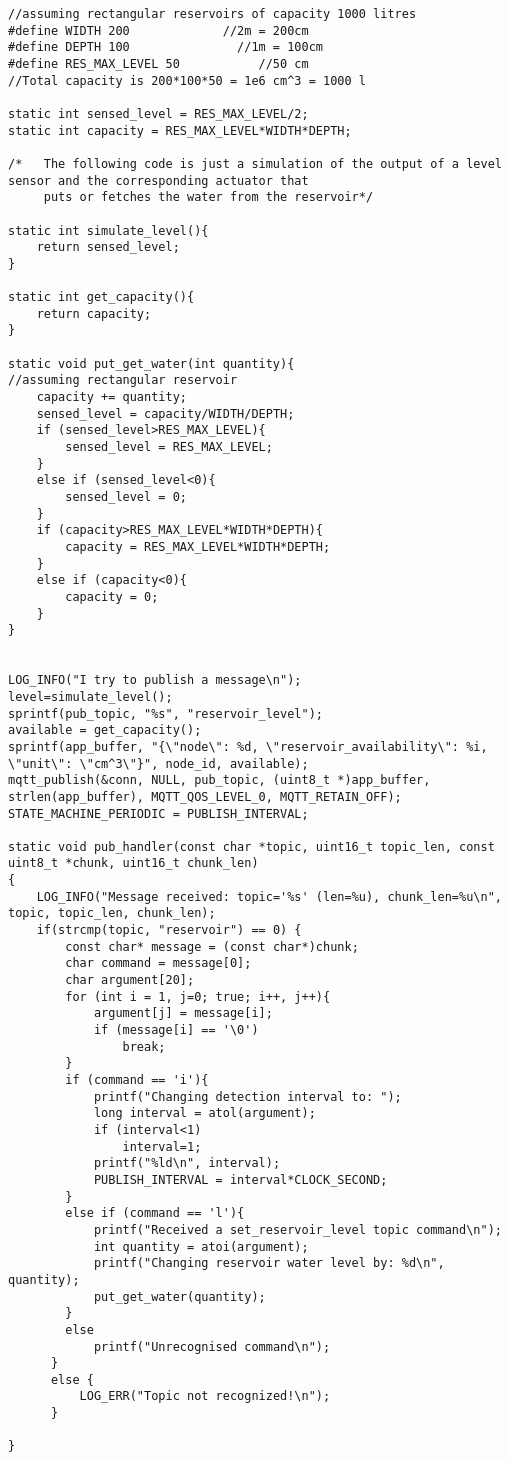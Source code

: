 \begin{lstlisting}
//assuming rectangular reservoirs of capacity 1000 litres
#define WIDTH 200             //2m = 200cm
#define DEPTH 100               //1m = 100cm
#define RES_MAX_LEVEL 50           //50 cm
//Total capacity is 200*100*50 = 1e6 cm^3 = 1000 l

static int sensed_level = RES_MAX_LEVEL/2;
static int capacity = RES_MAX_LEVEL*WIDTH*DEPTH;

/*   The following code is just a simulation of the output of a level sensor and the corresponding actuator that
     puts or fetches the water from the reservoir*/

static int simulate_level(){
    return sensed_level;
}

static int get_capacity(){
    return capacity;
}

static void put_get_water(int quantity){
//assuming rectangular reservoir
    capacity += quantity;
    sensed_level = capacity/WIDTH/DEPTH;
    if (sensed_level>RES_MAX_LEVEL){
        sensed_level = RES_MAX_LEVEL;
    }
    else if (sensed_level<0){
        sensed_level = 0;
    }
    if (capacity>RES_MAX_LEVEL*WIDTH*DEPTH){
        capacity = RES_MAX_LEVEL*WIDTH*DEPTH;
    }
    else if (capacity<0){
        capacity = 0;
    }
}


LOG_INFO("I try to publish a message\n");
level=simulate_level();
sprintf(pub_topic, "%s", "reservoir_level");
available = get_capacity();
sprintf(app_buffer, "{\"node\": %d, \"reservoir_availability\": %i, \"unit\": \"cm^3\"}", node_id, available);
mqtt_publish(&conn, NULL, pub_topic, (uint8_t *)app_buffer, strlen(app_buffer), MQTT_QOS_LEVEL_0, MQTT_RETAIN_OFF);
STATE_MACHINE_PERIODIC = PUBLISH_INTERVAL;

static void pub_handler(const char *topic, uint16_t topic_len, const uint8_t *chunk, uint16_t chunk_len)
{
	LOG_INFO("Message received: topic='%s' (len=%u), chunk_len=%u\n", topic, topic_len, chunk_len);
    if(strcmp(topic, "reservoir") == 0) {
        const char* message = (const char*)chunk;
        char command = message[0];
        char argument[20];
        for (int i = 1, j=0; true; i++, j++){
            argument[j] = message[i];
            if (message[i] == '\0')
                break;
        }
        if (command == 'i'){
            printf("Changing detection interval to: ");
            long interval = atol(argument);
            if (interval<1)
                interval=1;
            printf("%ld\n", interval);
            PUBLISH_INTERVAL = interval*CLOCK_SECOND;
        }
        else if (command == 'l'){
            printf("Received a set_reservoir_level topic command\n");
            int quantity = atoi(argument);
            printf("Changing reservoir water level by: %d\n", quantity);
            put_get_water(quantity);
        }
        else
            printf("Unrecognised command\n");
      }
      else {
    	  LOG_ERR("Topic not recognized!\n");
      }

}


\end{lstlisting}



